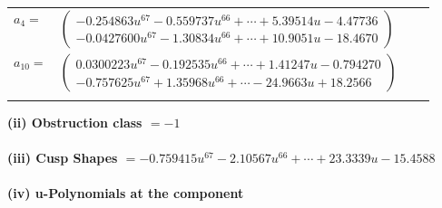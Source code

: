 \documentclass[1p]{elsarticle_modified}
\theoremstyle{definition}
\begin{document}
\begin{tabular}{m{7pt} m{180pt} m{7pt} m{180pt} }
\flushright $a_{4}=$&$\begin{pmatrix}-0.254863 u^{67}-0.559737 u^{66}+\cdots+5.39514 u-4.47736\\-0.0427600 u^{67}-1.30834 u^{66}+\cdots+10.9051 u-18.4670\end{pmatrix}$ \\
\flushright $a_{10}=$&$\begin{pmatrix}0.0300223 u^{67}-0.192535 u^{66}+\cdots+1.41247 u-0.794270\\-0.757625 u^{67}+1.35968 u^{66}+\cdots-24.9663 u+18.2566\end{pmatrix}$\\&\end{tabular}
\flushleft \textbf{(ii) Obstruction class $= -1$}\\~\\
\flushleft \textbf{(iii) Cusp Shapes $= -0.759415 u^{67}-2.10567 u^{66}+\cdots+23.3339 u-15.4588$}\\~\\
\newpage\renewcommand{\arraystretch}{1}
\flushleft \textbf{(iv) u-Polynomials at the component}\newline \\
\end{document}
